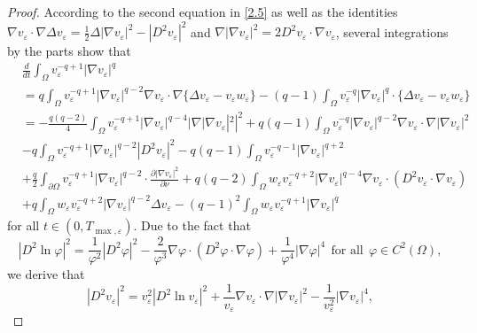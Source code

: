 \documentclass[12pt]{article}
\theoremstyle{plain}
\theoremstyle{definition}
\numberwithin{equation}{section}
\begin{document}
\begin{proof}
    According to the second equation in \eqref{2.5} as well as the identities $\nabla v_\varepsilon\cdot\nabla\Delta v_\varepsilon=\frac{1}{2}\Delta|\nabla v_\varepsilon|^2-|D^2v_\varepsilon|^2$ and $\nabla|\nabla v_\varepsilon|^2=2D^2v_\varepsilon\cdot\nabla v_\varepsilon$, several integrations by the parts show that
    \begin{align}\label{2.16}
           & \frac{d}{dt}\int_\Omega v_\varepsilon^{-q+1}|\nabla v_\varepsilon|^q\nonumber\\
            &=q\int_\Omega v_\varepsilon^{-q+1}|\nabla v_\varepsilon|^{q-2}\nabla v_\varepsilon\cdot\nabla\{\Delta v_\varepsilon-v_\varepsilon w_\varepsilon\}-(q-1)\int_\Omega v_\varepsilon^{-q}|\nabla v_\varepsilon|^q\cdot\{\Delta v_\varepsilon-v_\varepsilon w_\varepsilon\}\nonumber\\
            &=-\frac{q(q-2)}{4}\int_\Omega v_\varepsilon^{-q+1}|\nabla v_\varepsilon|^{q-4}|\nabla|\nabla v_\varepsilon|^2|^2+q(q-1)\int_\Omega v_\varepsilon^{-q}|\nabla v_\varepsilon|^{q-2}\nabla v_\varepsilon\cdot\nabla|\nabla v_\varepsilon|^2\nonumber\\
            &-q\int_\Omega v_\varepsilon^{-q+1}|\nabla v_\varepsilon|^{q-2}|D^2 v_\varepsilon|^2-q(q-1)\int_\Omega v_\varepsilon^{-q-1}|\nabla v_\varepsilon|^{q+2}\\
            &+\frac{q}{2}\int_{\partial\Omega}v_\varepsilon^{-q+1}|\nabla v_\varepsilon|^{q-2}\cdot\frac{\partial|\nabla v_\varepsilon|^2}{\partial\nu}+q(q-2)\int_\Omega w_\varepsilon v_\varepsilon^{-q+2}|\nabla v_\varepsilon|^{q-4}\nabla v_\varepsilon\cdot(D^2 v_\varepsilon\cdot\nabla v_\varepsilon)\nonumber\\
            &+q\int_\Omega w_\varepsilon v_\varepsilon^{-q+2}|\nabla v_\varepsilon|^{q-2}\Delta v_\varepsilon-(q-1)^2\int_\Omega w_\varepsilon v_\varepsilon^{-q+1}|\nabla v_\varepsilon|^q\nonumber
    \end{align}
    for all $t\in(0,T_{\max,\varepsilon})$. Due to the fact that
    \begin{equation*}
        |D^2\ln\varphi|^2=\frac{1}{\varphi^2}|D^2\varphi|^2-\frac{2}{\varphi^3}\nabla\varphi\cdot(D^2\varphi\cdot\nabla\varphi)+\frac{1}{\varphi^4}|\nabla\varphi|^4~~\mbox{for all}~~\varphi\in C^2(\Omega),
    \end{equation*}
we derive that
    \begin{equation*}
        |D^2v_\varepsilon|^2=v_\varepsilon^2|D^2\ln v_\varepsilon|^2+\frac{1}{v_\varepsilon}\nabla v_\varepsilon\cdot\nabla|\nabla v_\varepsilon|^2-\frac{1}{v_\varepsilon^2}|\nabla v_\varepsilon|^4,

\end{equation*}
\end{proof}
\end{document}
